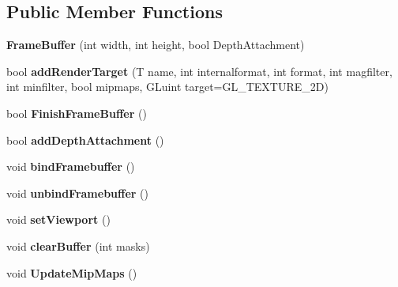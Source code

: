 \subsection*{Public Member Functions}
\begin{DoxyCompactItemize}
\item 
{\bfseries Frame\+Buffer} (int width, int height, bool Depth\+Attachment)\hypertarget{class_frame_buffer_ab7b122bbfc713a58e3d54e5b7474af56}{}\label{class_frame_buffer_ab7b122bbfc713a58e3d54e5b7474af56}

\item 
bool {\bfseries add\+Render\+Target} (T name, int internalformat, int format, int magfilter, int minfilter, bool mipmaps, G\+Luint target=G\+L\+\_\+\+T\+E\+X\+T\+U\+R\+E\+\_\+2D)\hypertarget{class_frame_buffer_ab09573b43ca1906bb3c106f4a9ea7078}{}\label{class_frame_buffer_ab09573b43ca1906bb3c106f4a9ea7078}

\item 
bool {\bfseries Finish\+Frame\+Buffer} ()\hypertarget{class_frame_buffer_ade95eb0f5e2c9112727fd5fcd39e7f98}{}\label{class_frame_buffer_ade95eb0f5e2c9112727fd5fcd39e7f98}

\item 
bool {\bfseries add\+Depth\+Attachment} ()\hypertarget{class_frame_buffer_a10bb6b1df517a12113e37bf913d4f78a}{}\label{class_frame_buffer_a10bb6b1df517a12113e37bf913d4f78a}

\item 
void {\bfseries bind\+Framebuffer} ()\hypertarget{class_frame_buffer_ab8d75432d798f90e01e48f1c8b12cbd2}{}\label{class_frame_buffer_ab8d75432d798f90e01e48f1c8b12cbd2}

\item 
void {\bfseries unbind\+Framebuffer} ()\hypertarget{class_frame_buffer_a28daa4e95495388f1d58ba72cc6b3116}{}\label{class_frame_buffer_a28daa4e95495388f1d58ba72cc6b3116}

\item 
void {\bfseries set\+Viewport} ()\hypertarget{class_frame_buffer_a38d76aa81993cb1bcf28b811ccb7e97e}{}\label{class_frame_buffer_a38d76aa81993cb1bcf28b811ccb7e97e}

\item 
void {\bfseries clear\+Buffer} (int masks)\hypertarget{class_frame_buffer_a9678f75bff552a860451aec9aa268b80}{}\label{class_frame_buffer_a9678f75bff552a860451aec9aa268b80}

\item 
void {\bfseries Update\+Mip\+Maps} ()\hypertarget{class_frame_buffer_ae547f88e0e9081bfd4e8c2cc98ca3198}{}\label{class_frame_buffer_ae547f88e0e9081bfd4e8c2cc98ca3198}


\end{DoxyCompactItemize}
